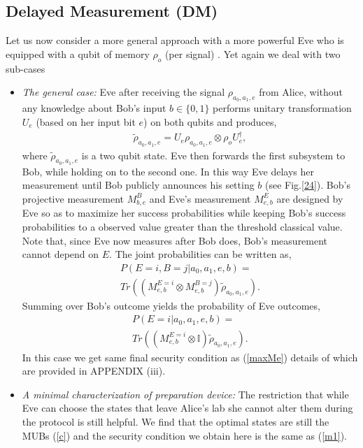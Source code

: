 \documentclass[smallextended]{svjour3}
\newcommand{\be}{\begin{eqnarray}}
\newcommand{\ee}{\end{eqnarray}}
\newcommand{\Tr}{\mathrm{Tr}}
\begin{document}
\subsection{\label{sec:level2}Delayed Measurement (DM)}
Let us now consider a more general approach with a more powerful Eve who is equipped with a qubit of memory $\rho_{o}$ (per signal) \cite{DM1,DM2}.  Yet again we deal with two sub-cases
\begin{itemize}
\item \textit{The general case:} Eve after receiving the signal $\rho_{a_0,a_1,e}$ from Alice, without any knowledge about Bob's input $b\in\{0,1\}$ performs unitary transformation $U_e$ (based on her input bit $e$) on both qubits and produces,
\be
\tilde{\rho}_{a_0,a_1,e}=U_e\rho_{a_0,a_1,e}\otimes \rho_{o}U_e^\dagger,
\ee
where $\tilde{\rho}_{a_0,a_1,e}$ is a two qubit state. Eve then forwards the first subsystem to Bob, while holding on to the second one. In this way Eve delays her measurement until Bob publicly announces his setting $b$ (see Fig.\ref{24}).  Bob's projective measurement $M_{b,e}^B$ and Eve's measurement $M_{e,b}^E$ are designed by Eve so as to maximize her success probabilities while keeping Bob's success probabilities to a observed value greater than the threshold classical value. Note that, since Eve now measures after Bob does, Bob's measurement cannot depend on $E$. The joint probabilities can be written as,
\begin{equation}
\begin{split}
P(E=i,B=j|a_0,a_1,e,b)=
\\Tr((M_{e,b}^{E=i}\otimes M_{e,b}^{B=j})\tilde{\rho}_{a_0,a_1,e}).
\end{split}
\end{equation}
Summing over Bob's outcome yields the probability of Eve outcomes,
\begin{equation}
\begin{split}
P(E=i|a_0,a_1,e,b)= \\ Tr((M_{e,b}^{E=i}\otimes \mathbb{I})\tilde{\rho}_{a_0,a_1,e}). 
\end{split}
\end{equation}
In this case we get same final security condition as (\ref{maxMe}) details of which are provided in APPENDIX (iii).
\item \textit{A minimal characterization of preparation device:} The restriction that while Eve can choose the states that leave Alice's lab she cannot alter them during the protocol is still helpful. We find that the optimal states are still the MUBs (\ref{c}) and the security condition we obtain here is the same as (\ref{m1}). 
\end{itemize}
\end{document}
